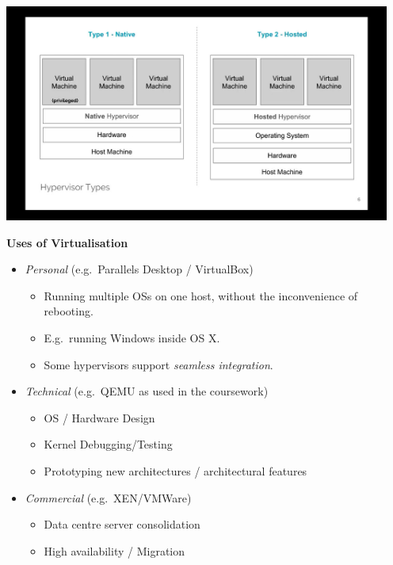\documentclass[11pt,a4paper]{article}
\begin{document}
\includegraphics[height=270]{hypervisor-types.jpg}

\textbf{Uses of Virtualisation}
\begin{itemize}
    \item \emph{Personal} (e.g.\ Parallels Desktop / VirtualBox)
        \begin{itemize}
            \item Running multiple OSs on one host, without the inconvenience of rebooting.
            \item E.g.\ running Windows inside OS X.
            \item Some hypervisors support \emph{seamless integration}.
        \end{itemize}
    \item \emph{Technical} (e.g.\ QEMU as used in the coursework)
        \begin{itemize}
            \item OS / Hardware Design
            \item Kernel Debugging/Testing
            \item Prototyping new architectures / architectural features
        \end{itemize}
    \item \emph{Commercial} (e.g.\ XEN/VMWare)
        \begin{itemize}
            \item Data centre server consolidation
            \item High availability / Migration
        \end{itemize}
\end{itemize}
\end{document}
